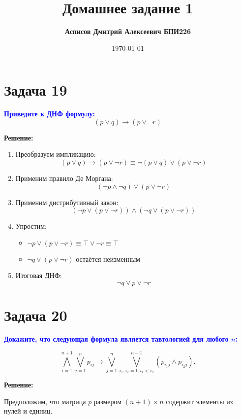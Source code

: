 \documentclass[12pt,a4paper]{article}
\title{\textbf{Домашнее задание 1}}
\author{\textbf{Асписов Дмитрий Алексеевич БПИ226}}
\date{\today}
\begin{document}
\maketitle

\section*{Задача 19}
\textcolor{blue}{\textbf{Приведите к ДНФ формулу:}}
\[
(p \vee q) \rightarrow (p \vee \neg r)
\]

\textbf{Решение:}

\begin{enumerate}[label=\arabic*., leftmargin=*]
\item Преобразуем импликацию:
   \[
   (p \vee q) \rightarrow (p \vee \neg r) 
   \equiv \neg (p \vee q) \vee (p \vee \neg r)
   \]

\item Применим правило Де Моргана:
   \[
   (\neg p \wedge \neg q) \vee (p \vee \neg r)
   \]

\item Применим дистрибутивный закон:
   \[
   (\neg p \vee (p \vee \neg r)) \wedge (\neg q \vee (p \vee \neg r))
   \]

\item Упростим:
   \begin{itemize}
   \item $\neg p \vee (p \vee \neg r) \equiv \top \vee \neg r \equiv \top$
   \item $\neg q \vee (p \vee \neg r)$ остаётся неизменным
   \end{itemize}

\item Итоговая ДНФ:
   \[
   \boxed{\neg q \vee p \vee \neg r}
   \]
\end{enumerate}

\section*{Задача 20}
\textcolor{blue}{\textbf{Докажите, что следующая формула является тавтологией для любого $n$:}}

\[
\bigwedge_{i=1}^{n+1} \bigvee_{j=1}^n p_{ij} \rightarrow \bigvee_{j=1}^n \bigvee_{i_1,i_2=1, i_1<i_2}^{n+1} (p_{i_1j} \wedge p_{i_2j}).
\]

\textbf{Решение:}

Предположим, что матрица \(p\) размером \((n+1) \times n\) содержит элементы из нулей и единиц.
\end{document}
